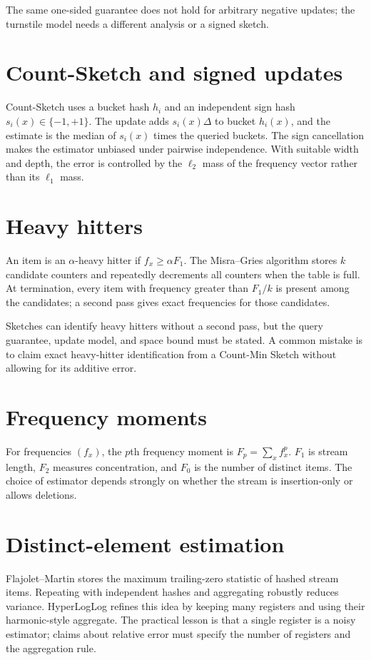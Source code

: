 The same one-sided guarantee does not hold for arbitrary negative updates;
the turnstile model needs a different analysis or a signed sketch.

\section{Count-Sketch and signed updates}

Count-Sketch uses a bucket hash $h_i$ and an independent sign hash
$s_i(x)\in\{-1,+1\}$.  The update adds $s_i(x)\Delta$ to bucket $h_i(x)$,
and the estimate is the median of $s_i(x)$ times the queried buckets.
The sign cancellation makes the estimator unbiased under pairwise
independence.  With suitable width and depth, the error is controlled by the
$\ell_2$ mass of the frequency vector rather than its $\ell_1$ mass.

\section{Heavy hitters}

An item is an $\alpha$-heavy hitter if $f_x\geq\alpha F_1$.  The Misra--Gries
algorithm stores $k$ candidate counters and repeatedly decrements all
counters when the table is full.  At termination, every item with frequency
greater than $F_1/k$ is present among the candidates; a second pass gives
exact frequencies for those candidates.

Sketches can identify heavy hitters without a second pass, but the query
guarantee, update model, and space bound must be stated.  A common mistake is
to claim exact heavy-hitter identification from a Count-Min Sketch without
allowing for its additive error.

\section{Frequency moments}

For frequencies $(f_x)$, the $p$th frequency moment is
$F_p=\sum_x f_x^p$.  $F_1$ is stream length, $F_2$ measures concentration,
and $F_0$ is the number of distinct items.  The choice of estimator depends
strongly on whether the stream is insertion-only or allows deletions.

\section{Distinct-element estimation}

Flajolet--Martin stores the maximum trailing-zero statistic of hashed stream
items.  Repeating with independent hashes and aggregating robustly reduces
variance.  HyperLogLog refines this idea by keeping many registers and using
their harmonic-style aggregate.  The practical lesson is that a single
register is a noisy estimator; claims about relative error must specify the
number of registers and the aggregation rule.

